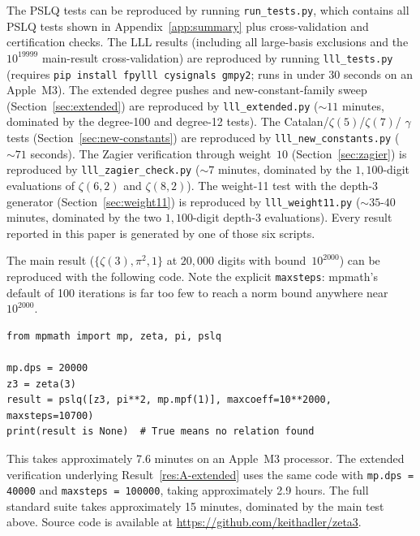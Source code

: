 \documentclass[12pt]{article}
\theoremstyle{definition}
\theoremstyle{remark}
\begin{document}
The PSLQ tests can be reproduced by running \texttt{run\_tests.py},
which contains all PSLQ tests shown in Appendix~\ref{app:summary}
plus cross-validation and certification checks.  The LLL results
(including all large-basis exclusions and the $10^{19999}$
main-result cross-validation) are reproduced by running
\texttt{lll\_tests.py} (requires \texttt{pip install fpylll cysignals
gmpy2}; runs in under 30 seconds on an Apple~M3).  The extended degree
pushes and new-constant-family sweep
(Section~\ref{sec:extended}) are reproduced by
\texttt{lll\_extended.py} ($\sim 11$ minutes, dominated by the
degree-100 and degree-12 tests).  The Catalan/$\zeta(5)$/$\zeta(7)$/
$\gamma$ tests (Section~\ref{sec:new-constants}) are reproduced by
\texttt{lll\_new\_constants.py} ($\sim 71$ seconds).  The Zagier
verification through weight~$10$ (Section~\ref{sec:zagier}) is
reproduced by \texttt{lll\_zagier\_check.py} ($\sim 7$ minutes,
dominated by the $1{,}100$-digit evaluations of $\zeta(6,2)$ and
$\zeta(8,2)$).  The weight-11 test with the depth-3 generator
(Section~\ref{sec:weight11}) is reproduced by
\texttt{lll\_weight11.py} ($\sim 35$-$40$ minutes, dominated by the
two $1{,}100$-digit depth-3 evaluations).  Every result reported in
this paper is generated by one of those six scripts.

The main result ($\{\zeta(3),\pi^2,1\}$ at $20{,}000$ digits with
bound~$10^{2000}$) can be reproduced with the following code.  Note
the explicit \texttt{maxsteps}: mpmath's default of 100 iterations is
far too few to reach a norm bound anywhere near $10^{2000}$.

\begin{verbatim}
from mpmath import mp, zeta, pi, pslq

mp.dps = 20000
z3 = zeta(3)
result = pslq([z3, pi**2, mp.mpf(1)], maxcoeff=10**2000, maxsteps=10700)
print(result is None)  # True means no relation found
\end{verbatim}

\noindent This takes approximately 7.6 minutes on an Apple~M3
processor.  The extended verification underlying
Result~\ref{res:A-extended} uses the same code with
\texttt{mp.dps = 40000} and \texttt{maxsteps = 100000}, taking
approximately 2.9 hours.  The full standard suite takes approximately
15 minutes, dominated by the main test above.  Source code is
available at \url{https://github.com/keithadler/zeta3}.
\end{document}
